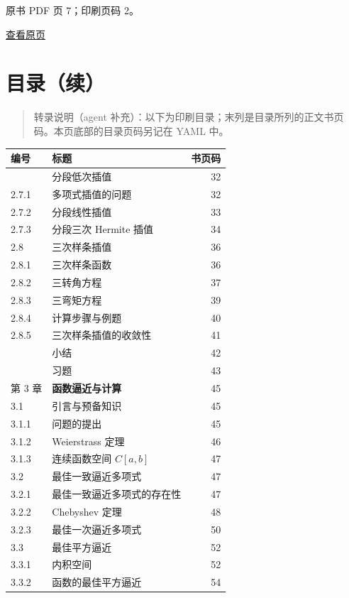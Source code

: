 \clearpage

原书 PDF 页 7；印刷页码 2。

\href{source-images/pdf-007.jpeg}{查看原页}

\section{目录（续）}\label{front-ux76eeux5f55ux7eed}

\begin{quote}
转录说明（agent 补充）：以下为印刷目录；末列是目录所列的正文书页码。本页底部的目录页码另记在 YAML 中。
\end{quote}

{\def\LTcaptype{none} %
\begin{longtable}[]{@{}llr@{}}
\toprule\noalign{}
编号 & 标题 & 书页码 \\
\midrule\noalign{}
\endhead
\bottomrule\noalign{}
\endlastfoot
2.7 & 分段低次插值 & 32 \\
2.7.1 & 多项式插值的问题 & 32 \\
2.7.2 & 分段线性插值 & 33 \\
2.7.3 & 分段三次 Hermite 插值 & 34 \\
2.8 & 三次样条插值 & 36 \\
2.8.1 & 三次样条函数 & 36 \\
2.8.2 & 三转角方程 & 37 \\
2.8.3 & 三弯矩方程 & 39 \\
2.8.4 & 计算步骤与例题 & 40 \\
2.8.5 & 三次样条插值的收敛性 & 41 \\
& 小结 & 42 \\
& 习题 & 43 \\
第 3 章 & \textbf{函数逼近与计算} & 45 \\
3.1 & 引言与预备知识 & 45 \\
3.1.1 & 问题的提出 & 45 \\
3.1.2 & Weierstrass 定理 & 46 \\
3.1.3 & 连续函数空间 \(C[a,b]\) & 47 \\
3.2 & 最佳一致逼近多项式 & 47 \\
3.2.1 & 最佳一致逼近多项式的存在性 & 47 \\
3.2.2 & Chebyshev 定理 & 48 \\
3.2.3 & 最佳一次逼近多项式 & 50 \\
3.3 & 最佳平方逼近 & 52 \\
3.3.1 & 内积空间 & 52 \\
3.3.2 & 函数的最佳平方逼近 & 54 \\

\end{longtable}}
